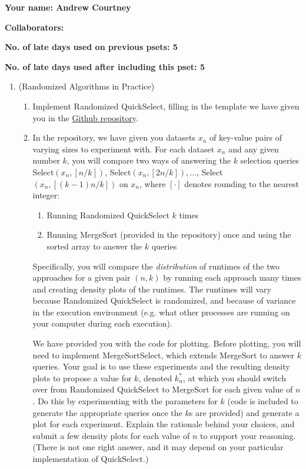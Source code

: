\documentclass[11pt]{article}
\begin{document}

\textbf{Your name: Andrew Courtney}

\textbf{Collaborators: }

\textbf{No. of late days used on previous psets: 5}

\textbf{No. of late days used after including this pset: 5}

\begin{enumerate}
    \item (Randomized Algorithms in Practice)  
    \begin{enumerate}
        \item Implement Randomized QuickSelect, filling in the template we have given you in the \href{https://github.com/Harvard-CS-120/cs120/tree/main/fall2022/psets}{Github repository}.  
        
        \item 
        In the repository, we have given you datasets $x_n$ of key-value pairs of varying sizes to experiment with.  For each dataset $x_n$ and any given number $k$, you will compare two ways of answering the $k$ selection queries
        Select$(x_n,[n/k])$, Select$(x_n,[2n/k]), \ldots$, Select$(x_n,[(k-1)n/k])$ on $x_n$, where $[\cdot]$ denotes rounding to the nearest integer:
        \begin{enumerate}
            \item Running Randomized QuickSelect $k$ times
            \item Running MergeSort (provided in the repository) once and using the sorted array to answer the $k$ queries
        \end{enumerate}
        Specifically, you will compare the {\em distribution} of runtimes of the two approaches for a given pair $(n,k)$ by running each approach many times and creating density plots of the runtimes.  The runtimes will vary because Randomized QuickSelect  is randomized, and because of variance in the execution environment (e.g. what other processes are running on your computer during each execution).
        
        We have provided you with the code for plotting. Before plotting, you will need to implement MergeSortSelect, which extends MergeSort to answer $k$ queries. Your goal is to use these experiments and the resulting density plots to propose a value for $k$, denoted $k^*_n$, at which you should switch over from Randomized QuickSelect to MergeSort for each given value of $n$. Do this by experimenting with the parameters for $k$ (code is included to generate the appropriate queries once the $k$s are provided) and generate a plot for each experiment.  Explain the rationale behind your choices, and submit a few density plots for each value of $n$ to support your reasoning.  (There is not one right answer, and it may depend on your particular implementation of QuickSelect.) 
        

\end{enumerate}
\end{enumerate}
\end{document}
